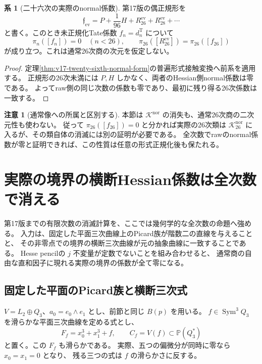 \documentclass[a4paper,11pt]{ltjsarticle}
\theoremstyle{definition}
\newtheorem{remark}[theorem]{注意}
\newtheorem{corollary}[theorem]{系}
\begin{document}
\begin{corollary}[二十六次の実際のnormal係数]
\label{cor:v18-actual26-normal-equals-raw}
第17版の偶正規形を
\[
 \mathfrak f_{\mathrm{ev}}=P+\frac1{96}H+
          R_{26}^{\mathrm{ev}}+R_{28}^{\mathrm{ev}}+\cdots
\]
と書く。このとき未正規化Tate係数 $f_n=d_n^{\mathrm T}$ について
\[
 \pi_n([f_n])=0\quad(n<26),\qquad
 \pi_{26}([R_{26}^{\mathrm{ev}}])=\pi_{26}([f_{26}])
\]
が成り立つ。これは通常26次商の次元を仮定しない。
\end{corollary}

\begin{proof}
定理\ref{thm:v17-twenty-sixth-normal-form}の普遍形式接触変換へ前系を適用する。
正規形の26次未満には $P,H$ しかなく、両者のHessian側normal係数は零である。
よってraw側の同じ次数の係数も零であり、最初に残り得る26次係数は一致する。
\end{proof}

\begin{remark}[通常像への所属と区別する]
本節は $\mathcal K^{\mathrm{nor}}$ の消失も、通常26次商の二次元性も使わない。
従って $\pi_{26}([f_{26}])=0$ と分かれば実際の26次類は
$\mathcal K_{26}^{\mathrm{nor}}$ に入るが、その類自体の消滅には別の証明が必要である。
全次数でrawのnormal係数が零と証明できれば、この性質は任意の形式正規化後も保たれる。
\end{remark}



\section{実際の境界の横断Hessian係数は全次数で消える}
\label{sec:v18-actual-normal-vanishing}

第17版までの有限次数の消滅計算を、ここでは幾何学的な全次数の命題へ強める。
入力は、固定した平面三次曲線上のPicard族が階数二の直線を与えることと、
その非零点での境界の横断三次曲線が元の抽象曲線に一致することである。
Hesse pencilの $j$ 不変量が定数でないことを組み合わせると、
通常商の自由な直和因子に現れる実際の境界の係数が全て零になる。

\subsection{固定した平面のPicard族と横断三次式}

$V=L_2\oplus Q_3$、$a_0=e_0\wedge e_1$ とし、前節と同じ $B(p)$ を用いる。
$f\in\operatorname{Sym}^3Q_3$ を滑らかな平面三次曲線を定める式とし、
\[
 F_f=x_0^3+x_1^3+f,\qquad C_f=V(f)\subset\mathbb P(Q_3^*)
\]
と置く。この $F_f$ も滑らかである。
実際、五つの偏微分が同時に零なら $x_0=x_1=0$ となり、
残る三つの式は $f$ の滑らかさに反する。
\end{document}
